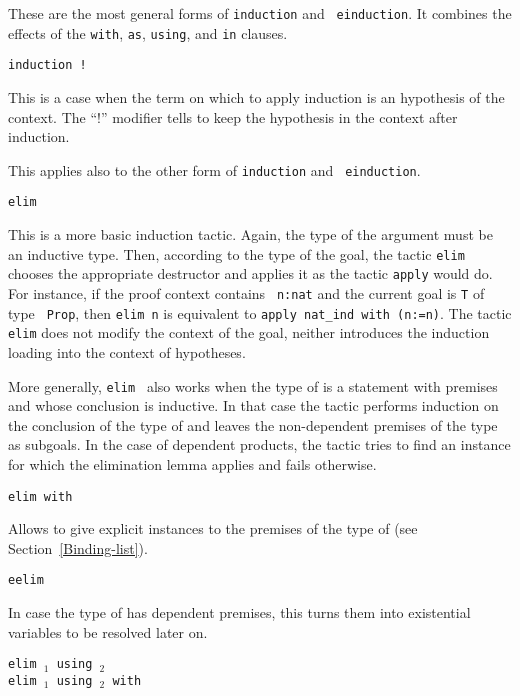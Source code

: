 \begin{coq_example*}
\begin{Variants}
  These are the most general forms of {\tt induction} and {\tt
  einduction}.  It combines the effects of the {\tt with}, {\tt as}, %
  {\tt using}, and {\tt in} clauses.

\item{\tt induction !{\ident}}

  This is a case when the term on which to apply induction is an
  hypothesis of the context. The ``!'' modifier tells to keep the
  hypothesis in the context after induction.

  This applies also to the other form of {\tt induction} and {\tt
    einduction}.

\item {\tt elim \term}\label{elim}

  This is a more basic induction tactic.  Again, the type of the
  argument {\term} must be an inductive type. Then, according to
  the type of the goal, the tactic {\tt elim} chooses the appropriate
  destructor and applies it as the tactic {\tt apply}
  would do. For instance, if the proof context contains {\tt
  n:nat} and the current goal is {\tt T} of type {\tt
  Prop}, then {\tt elim n} is equivalent to {\tt apply nat\_ind with
  (n:=n)}.  The tactic {\tt elim} does not modify the context of
  the goal, neither introduces the induction loading into the context
  of hypotheses.

  More generally, {\tt elim \term} also works when the type of {\term}
  is a statement with premises and whose conclusion is inductive.  In
  that case the tactic performs induction on the conclusion of the
  type of {\term} and leaves the non-dependent premises of the type as
  subgoals.  In the case of dependent products, the tactic tries to
  find an instance for which the elimination lemma applies and fails
  otherwise.

\item {\tt elim {\term} with {\bindinglist}}

  Allows to give explicit instances to the premises of the type
  of {\term} (see Section~\ref{Binding-list}).

\item{\tt eelim {\term}}

  In case the type of {\term} has dependent premises, this turns them into
  existential variables to be resolved later on.

\item{\tt elim {\term$_1$} using {\term$_2$}}\\
     {\tt elim {\term$_1$} using {\term$_2$} with {\bindinglist}}


\end{Variants}
\end{coq_example*}
